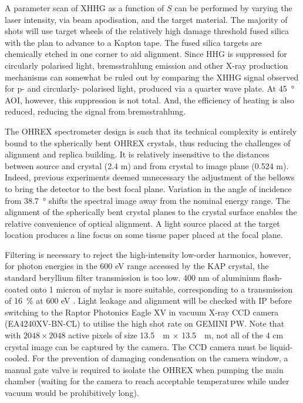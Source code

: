 A parameter scan of \ac{XHHG} as a function of $S$ can be performed by varying the laser intensity, via beam apodisation, and the target material. The majority of shots will use target wheels of the relatively high damage threshold fused silica with the plan to advance to a Kapton tape. The fused silica targets are chemically etched in one corner to aid alignment.
Since HHG is suppressed for circularly polarised light, bremsstrahlung emission and other X-ray production mechanisms can somewhat be ruled out by comparing the \ac{XHHG} signal observed for p- and circularly- polarised light, produced via a quarter wave plate. At \qty{45}{\degree} \ac{AOI}, however, this suppression is not total. And, the efficiency of heating is also reduced, reducing the signal from bremsstrahlung.

The OHREX spectrometer design is such that its technical complexity is entirely bound to the spherically bent OHREX crystals, thus reducing the challenges of alignment \cite{beiersdorferLineshapeSpectroscopyVery2016} and replica building. It is relatively insensitive to the distances between source and crystal (2.4 m) and from crystal to image plane (0.524 m). Indeed, previous experiments deemed unnecessary the adjustment of the bellows to bring the detector to the best focal plane. Variation in the angle of incidence from \qty{38.7}{\degree} shifts the spectral image away from the nominal energy range. 
The alignment of the spherically bent crystal planes to the crystal surface enables the relative convenience of optical alignment. A light source placed at the target location produces a line focus on some tissue paper placed at the focal plane. 

Filtering is necessary to reject the high-intensity low-order harmonics, however, for photon energies in the 600 eV range accessed by the KAP crystal, the standard beryllium filter transmission is too low. 400 nm of aluminium flash-coated onto 1 micron of mylar is more suitable, corresponding to a transmission of \qty{16}{\%} at 600 eV \cite{henkeXRayInteractionsPhotoabsorption1993}. Light leakage and alignment will be checked with IP before switching to the Raptor Photonics Eagle XV in vacuum X-ray CCD camera (EA4240XV-BN-CL) \cite{EagleXVVacuum} to utilise the high shot rate on GEMINI PW. Note that with $2048 \times 2048$ active pixels of size \qty{13.5}{\mu m} $\times$ \qty{13.5}{\mu m}, not all of the 4 cm crystal image can be captured by the camera. The CCD camera must be liquid-cooled. For the prevention of damaging condensation on the camera window, a manual gate valve is required to isolate the OHREX when pumping the main chamber (waiting for the camera to reach acceptable temperatures while under vacuum would be prohibitively long). 


